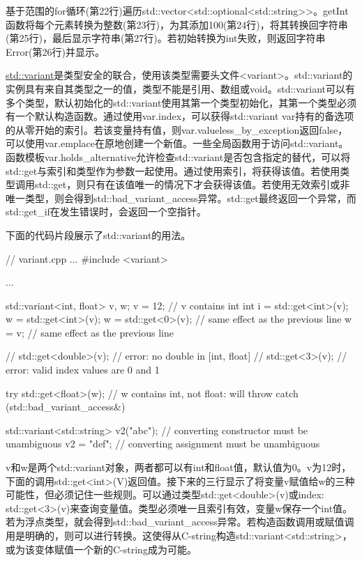 基于范围的for循环(第22行)遍历std::vector<std::optional<std::string>{}>。getInt函数将每个元素转换为整数(第23行)，为其添加100(第24行)，将其转换回字符串(第25行)，最后显示字符串(第27行)。若初始转换为int失败，则返回字符串Error(第26行)并显示。


\href{http://en.cppreference.com/w/cpp/utility/variant}{std::variant}是类型安全的联合，使用该类型需要头文件<variant>。std::variant的实例具有来自其类型之一的值，类型不能是引用、数组或void。std::variant可以有多个类型，默认初始化的std::variant使用其第一个类型初始化，其第一个类型必须有一个默认构造函数。通过使用var.index，可以获得std::variant var持有的备选项的从零开始的索引。若该变量持有值，则var.valueless\_by\_exception返回false，可以使用var.emplace在原地创建一个新值。一些全局函数用于访问std::variant。函数模板var.holds\_alternative允许检查std::variant是否包含指定的替代，可以将std::get与索引和类型作为参数一起使用。通过使用索引，将获得该值。若使用类型调用std::get，则只有在该值唯一的情况下才会获得该值。若使用无效索引或非唯一类型，则会得到std::bad\_variant\_access异常。std::get最终返回一个异常，而std::get\_if在发生错误时，会返回一个空指针。

下面的代码片段展示了std::variant的用法。


\begin{cpp}
// variant.cpp
...
#include <variant>

...

std::variant<int, float> v, w;
v = 12; // v contains int
int i = std::get<int>(v);
w = std::get<int>(v);
w = std::get<0>(v); // same effect as the previous line
w = v; // same effect as the previous line

// std::get<double>(v); // error: no double in [int, float]
// std::get<3>(v); // error: valid index values are 0 and 1

try{
	std::get<float>(w); // w contains int, not float: will throw
}
catch (std::bad_variant_access&) {}

std::variant<std::string> v2("abc"); // converting constructor must be unambiguous
v2 = "def"; // converting assignment must be unambiguous
\end{cpp}

v和w是两个std::variant对象，两者都可以有int和float值，默认值为0。v为12时，下面的调用std::get<int>(V)返回值。接下来的三行显示了将变量v赋值给w的三种可能性，但必须记住一些规则。可以通过类型std::get<double>(v)或index: std::get<3>(v)来查询变量值。类型必须唯一且索引有效，变量w保存一个int值。若为浮点类型，就会得到std::bad\_variant\_access异常。若构造函数调用或赋值调用是明确的，则可以进行转换。这使得从C-string构造std::variant<std::string>，或为该变体赋值一个新的C-string成为可能。

